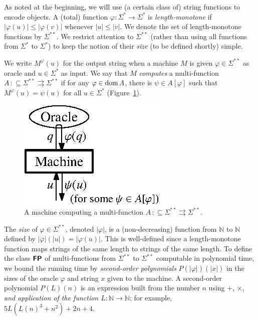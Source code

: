 \documentclass[envcountsect,envcountsame,orivec,oribibl]{llncs}
\newcommand{\N}{\mathbb N}
\newcommand{\classtwofont}[1]{\text{\bfseries \sffamily \upshape #1}}
\newcommand{\classFPtwo}{\classtwofont{FP}}
\newcommand{\LM}{\varSigma ^{**}}
\newcommand{\dom}{\mathop{\rm dom}}
\newcommand{\pcolon}{\mathpunct{\,:\subseteq}}
\begin{document}
As noted at the beginning, 
we will use (a certain class of) string functions to encode objects. 
A (total) function $\varphi \colon \varSigma^* \to \varSigma^*$ is 
\emph{length-monotone}
if $|\varphi(u)| \le |\varphi(v)|$ whenever $|u| \le |v|$.
We denote the set of length-monotone functions by $\LM$.
We restrict attention to $\LM$ (rather than using
all functions from $\varSigma ^*$ to $\varSigma ^*$) 
to keep the notion of their \emph{size} (to be defined shortly) simple. 

We write $M ^\varphi (u)$ for the output string 
when a machine $M$ is given
$\varphi \in \LM$ as oracle and $u \in \varSigma ^*$ as input.
We say that $M$ \emph{computes} 
a multi-function $A \pcolon \LM \rightrightarrows \LM$ if 
for any $\varphi \in \dom A$, there is $\psi \in A[\varphi]$ 
such that $M^\varphi(u) = \psi(u)$ for all $u \in \varSigma^*$
(Figure~\ref{figure: oracle machine}).
\begin{figure}
\begin{center}
\includegraphics[scale=0.9]{./oracle_machine.eps}
\caption{A machine computing a multi-function $A \pcolon \LM \rightrightarrows \LM$.}
\label{figure: oracle machine}
\end{center}
\end{figure}

The \emph{size} of $\varphi \in \LM$, denoted $|\varphi|$,
is a (non-decreasing) function from $\N$ to $\N$ defined by 
$|\varphi|(|u|) = |\varphi(u)|$.
This is well-defined since a length-monotone function maps 
strings of the same length to strings of the same length.
To define the class $\classFPtwo$ of 
multi-functions from $\LM$ to $\LM$ 
computable in polynomial time, 
we bound the running time by \emph{second-order polynomials} 
$P (\lvert \varphi \rvert) (\lvert x \rvert)$ 
in the sizes of the oracle $\varphi$ and string $x$
given to the machine. 
A second-order polynomial $P (L) (n)$ 
is an expression built from the number $n$ 
using $\mathord+$, $\mathord\times$, 
\emph{and application of the function $L \colon \N \to \N$}; 
for example, 
$5 L (L (n) ^3 + n^2) + 2 n + 4$. 
\end{document}
